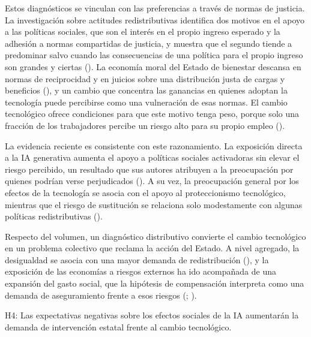 \documentclass[
  spanish,
  12pt,
]{article}
\begin{document}
Estos diagnósticos se vinculan con las preferencias a través de normas
de justicia. La investigación sobre actitudes redistributivas identifica
dos motivos en el apoyo a las políticas sociales, que son el interés en
el propio ingreso esperado y la adhesión a normas compartidas de
justicia, y muestra que el segundo tiende a predominar salvo cuando las
consecuencias de una política para el propio ingreso son grandes y
ciertas (). La economía
moral del Estado de bienestar descansa en normas de reciprocidad y en
juicios sobre una distribución justa de cargas y beneficios
(), y un cambio que concentra
las ganancias en quienes adoptan la tecnología puede percibirse como una
vulneración de esas normas. El cambio tecnológico ofrece condiciones
para que este motivo tenga peso, porque solo una fracción de los
trabajadores percibe un riesgo alto para su propio empleo
().

La evidencia reciente es consistente con este razonamiento. La
exposición directa a la IA generativa aumenta el apoyo a políticas
sociales activadoras sin elevar el riesgo percibido, un resultado que
sus autores atribuyen a la preocupación por quienes podrían verse
perjudicados (). A su vez, la preocupación general por los efectos de la
tecnología se asocia con el apoyo al proteccionismo tecnológico,
mientras que el riesgo de sustitución se relaciona solo modestamente con
algunas políticas redistributivas
().

Respecto del volumen, un diagnóstico distributivo convierte el cambio
tecnológico en un problema colectivo que reclama la acción del Estado. A
nivel agregado, la desigualdad se asocia con una mayor demanda de
redistribución (),
y la exposición de las economías a riesgos externos ha ido acompañada de
una expansión del gasto social, que la hipótesis de compensación
interpreta como una demanda de aseguramiento frente a esos riesgos
(;
).

\begin{tcolorbox}[enhanced jigsaw, arc=.35mm, bottomrule=.15mm, breakable, colback=white, colframe=quarto-callout-note-color-frame, left=2mm, leftrule=.75mm, opacityback=0, rightrule=.15mm, toprule=.15mm]

H4: Las expectativas negativas sobre los efectos sociales de la IA
aumentarán la demanda de intervención estatal frente al cambio
tecnológico.

\end{tcolorbox}
\end{document}

